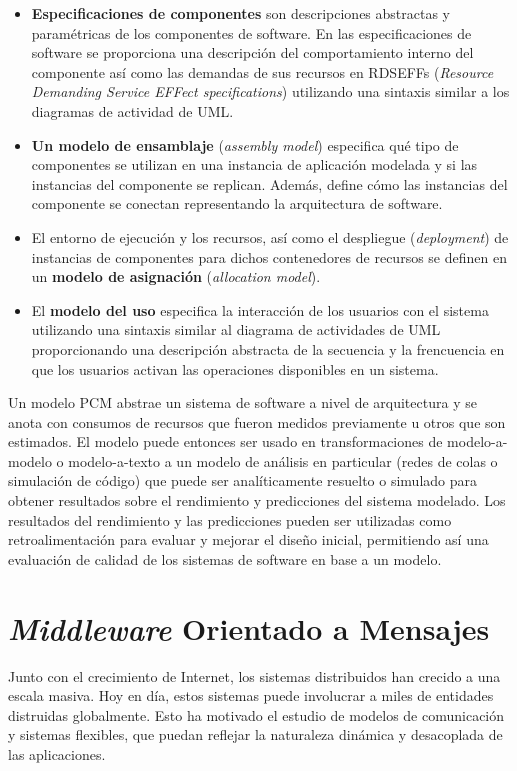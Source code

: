 \documentclass[article]{IEEEtran}
\begin{document}
\begin{itemize}
    \item \textbf{Especificaciones de componentes} son descripciones abstractas y paramétricas de los componentes de software. En las especificaciones de software se proporciona una descripción del comportamiento interno del componente así como las demandas de sus recursos en RDSEFFs (\emph{Resource Demanding Service EFFect specifications}) utilizando una sintaxis similar a los diagramas de actividad de UML.
    \item \textbf{Un modelo de ensamblaje} (\emph{assembly model}) especifica qué tipo de componentes se utilizan en una instancia de aplicación modelada y si las instancias del componente se replican. Además, define cómo las instancias del componente se conectan representando la arquitectura de software.
    \item El entorno de ejecución y los recursos, así como el despliegue (\emph{deployment}) de instancias de componentes para dichos contenedores de recursos se definen en un \textbf{modelo de asignación} (\emph{allocation model}).
    \item El \textbf{modelo del uso} especifica la interacción de los usuarios con el sistema utilizando una sintaxis similar al diagrama de actividades de UML proporcionando una descripción abstracta de la secuencia y la frencuencia en que los usuarios activan las operaciones disponibles en un sistema.
\end{itemize}

Un modelo PCM abstrae un sistema de software a nivel de arquitectura y se anota con consumos de recursos que fueron medidos previamente u otros que son estimados. El modelo puede entonces ser usado en transformaciones de modelo-a-modelo o modelo-a-texto a un modelo de análisis en particular (redes de colas o simulación de código) que puede ser analíticamente resuelto o simulado para obtener resultados sobre el rendimiento y predicciones del sistema modelado. Los resultados del rendimiento y las predicciones pueden ser utilizadas como retroalimentación para evaluar y mejorar el diseño inicial, permitiendo así una evaluación de calidad de los sistemas de software en base a un modelo\cite{noorshams}. 

\section{\emph{Middleware} Orientado a Mensajes} \label{sec:mom}
Junto con el crecimiento de Internet, los sistemas distribuidos han crecido a una escala masiva. Hoy en día, estos sistemas puede involucrar a miles de entidades distruidas globalmente. Esto ha motivado el estudio de modelos de comunicación y sistemas flexibles, que puedan reflejar la naturaleza dinámica y desacoplada de las aplicaciones.
\end{document}
